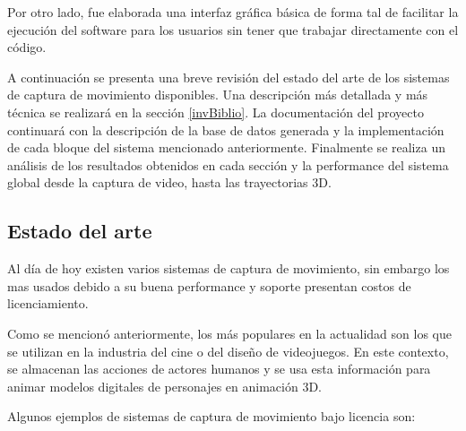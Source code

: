 Por otro lado, fue elaborada una interfaz gráfica básica de forma tal de facilitar la ejecución del software para los usuarios sin tener que trabajar directamente con el código.

A continuación se presenta una breve revisión del estado del arte de los sistemas de captura de movimiento disponibles. Una descripción más detallada y más técnica se realizará en la sección \ref{invBiblio}. La documentación del proyecto continuará con la descripción de la base de datos generada y la implementación de cada bloque del sistema mencionado anteriormente. Finalmente se realiza un análisis de los resultados obtenidos en cada sección y la performance del sistema global desde la captura de video, hasta las trayectorias 3D.

\subsection{Estado del arte}

Al día de hoy existen varios sistemas de captura de movimiento, sin embargo los mas usados debido a su buena performance y soporte presentan costos de licenciamiento. 

Como se mencionó anteriormente, los más populares en la actualidad son los que se utilizan en la industria del cine o del diseño de videojuegos. En este contexto, se almacenan las acciones de actores humanos y se usa esta información para animar modelos digitales de personajes en animación 3D.

Algunos ejemplos de sistemas de captura de movimiento bajo licencia son:

